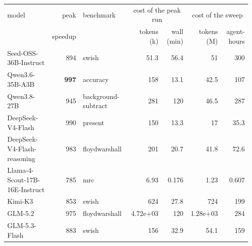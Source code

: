 \begin{tabular}{l r l r r r r}
\toprule
model & peak & benchmark & \multicolumn{2}{c}{cost of the peak run} & \multicolumn{2}{c}{cost of the sweep} \\
      & speedup &         & tokens (k) & wall (min) & tokens (M) & agent-hours \\
\midrule
Seed-OSS-36B-Instruct & 894 & swish & 51.3 & 56.4 & 51 & 300 \\
Qwen3.6-35B-A3B & \textbf{997} & accuracy & 158 & 13.1 & 42.5 & 107 \\
Qwen3.8-27B & 945 & background-subtract & 281 & 120 & 46.5 & 287 \\
DeepSeek-V4-Flash & 990 & present & 150 & 13.3 & 17 & 35.3 \\
DeepSeek-V4-Flash-reasoning & 983 & floydwarshall & 201 & 20.7 & 41.8 & 72.6 \\
Llama-4-Scout-17B-16E-Instruct & 785 & mrc & 6.93 & 0.176 & 1.23 & 0.607 \\
Kimi-K3 & 853 & swish & 624 & 27.8 & 724 & 199 \\
GLM-5.2 & 975 & floydwarshall & 4.72e+03 & 120 & 1.28e+03 & 284 \\
GLM-5.3-Flash & 883 & swish & 156 & 32.9 & 54.1 & 159 \\
\bottomrule
\end{tabular}
